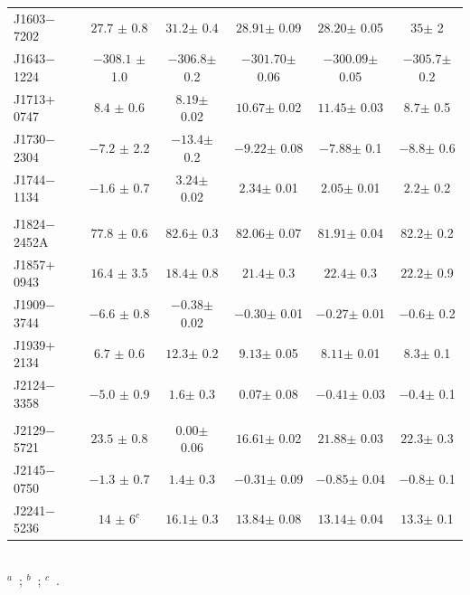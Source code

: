 \documentclass[useAMS,usenatbib]{mn2e}
\begin{document}
\begin{table}
\begin{tabular}{lccccc}
J1603$-$7202 & $27.7  $ $\pm$ 0.8      & $31.2   $$\pm$ 0.4   & $28.91   $$\pm$ 0.09  &  $28.20   $$\pm$ 0.05  &  $35     $$\pm$ 2    \\  
J1643$-$1224 & $-308.1$ $\pm$ 1.0      & $-306.8 $$\pm$ 0.2   & $-301.70 $$\pm$ 0.06  &  $-300.09 $$\pm$ 0.05  &  $-305.7 $$\pm$ 0.2    \\   
J1713$+$0747 & $8.4   $ $\pm$ 0.6      & $8.19   $$\pm$ 0.02  & $10.67   $$\pm$ 0.02  &  $11.45   $$\pm$ 0.03  &  $8.7    $$\pm$ 0.5    \\  
J1730$-$2304 & $-7.2  $ $\pm$ 2.2      & $-13.4  $$\pm$ 0.2   & $-9.22   $$\pm$ 0.08  &  $-7.88   $$\pm$ 0.1   &  $-8.8   $$\pm$ 0.6    \\  
J1744$-$1134 & $-1.6  $ $\pm$ 0.7      & $3.24   $$\pm$ 0.02  & $2.34    $$\pm$ 0.01  &  $2.05    $$\pm$ 0.01  &  $2.2    $$\pm$ 0.2    \\  
             &                         &                      &                       &                        &                        \\
J1824$-$2452A& $77.8  $ $\pm$ 0.6      & $82.6   $$\pm$ 0.3   & $82.06   $$\pm$ 0.07  &  $81.91   $$\pm$ 0.04  &  $82.2   $$\pm$ 0.2    \\  
J1857$+$0943 & $16.4  $ $\pm$ 3.5      & $18.4   $$\pm$ 0.8   & $21.4    $$\pm$ 0.3   &  $22.4    $$\pm$ 0.3   &  $22.2   $$\pm$ 0.9    \\  
J1909$-$3744 & $-6.6  $ $\pm$ 0.8      & $-0.38  $$\pm$ 0.02  & $-0.30   $$\pm$ 0.01  &  $-0.27   $$\pm$ 0.01  &  $-0.6   $$\pm$ 0.2    \\  
J1939$+$2134 & $6.7   $ $\pm$ 0.6      & $12.3   $$\pm$ 0.2   & $9.13    $$\pm$ 0.05  &  $8.11    $$\pm$ 0.01  &  $8.3    $$\pm$ 0.1    \\  
J2124$-$3358 & $-5.0  $ $\pm$ 0.9      & $1.6    $$\pm$ 0.3   & $0.07    $$\pm$ 0.08  &  $-0.41   $$\pm$ 0.03  &  $-0.4   $$\pm$ 0.1    \\  
             &                         &                      &                       &                        &                        \\
J2129$-$5721 & $23.5  $ $\pm$ 0.8      & $0.00   $$\pm$ 0.06  & $16.61   $$\pm$ 0.02  &  $21.88   $$\pm$ 0.03  &  $22.3   $$\pm$ 0.3     \\  
J2145$-$0750 & $-1.3  $ $\pm$ 0.7      & $1.4    $$\pm$ 0.3   & $-0.31   $$\pm$ 0.09  &  $-0.85   $$\pm$ 0.04  &  $-0.8   $$\pm$ 0.1     \\  
J2241$-$5236 & $14    $ $\pm$ $6^c$    & $16.1   $$\pm$ 0.3   & $13.84   $$\pm$ 0.08  &  $13.14   $$\pm$ 0.04  &  $13.3   $$\pm$ 0.1    \\
\hline
\end{tabular}
~\\
$^a$~\citet{Keith12}; $^b$~\citet{Burgay13}; $^c$~\citet{Keith11}.
\end{table}
 
\end{document}
